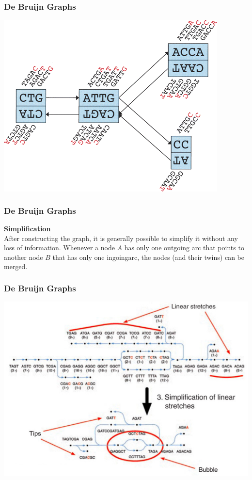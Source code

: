 \documentclass[pdf]{beamer}
\begin{document}
\begin{frame}
\frametitle{De Bruijn Graphs}
\begin{center}
\includegraphics[scale=0.5]{Figures/velvet_blocks.png} 
\end{center}
\end{frame}

\begin{frame}
\frametitle{De Bruijn Graphs}
\textbf{Simplification}\\
After constructing the graph, it is generally possible to simplify it without any loss of information. Whenever a node $A$ has only one outgoing arc that points to another node $B$ that has only one ingoingarc, the nodes (and their twins) can be merged.
\end{frame}

\begin{frame}
\frametitle{De Bruijn Graphs}
\begin{center}
\includegraphics[scale=0.4]{Figures/simplification.png}
\end{center}
\end{frame}
\end{document}
